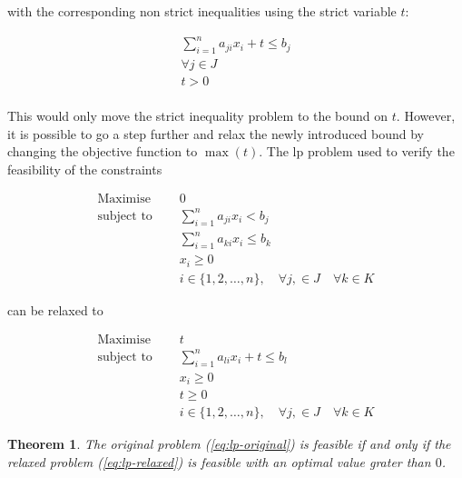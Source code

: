 \documentclass[preview,border=12pt,varwidth]{report}
\newtheorem{theorem}{Theorem}
\begin{document}
with the corresponding non strict inequalities using the strict variable $t$:

\begin{align*}
    \sum_{i=1}^{n} a_{ji}x_{i} + t \le b_j \\
    \forall j \in J                        \\
    t > 0                                  \\
\end{align*}

This would only move the strict inequality problem to the bound on $t$.
However, it is possible to go a step further and relax the newly introduced bound by changing the objective function to $\max(t)$.
The lp problem used to verify the feasibility of the constraints

\begin{equation}
    \label{eq:lp-original}
    \begin{split}
        \text{Maximise }   \quad & 0                                  \\
        \text{subject to } \quad & \sum_{i=1}^{n} a_{ji}x_{i} < b_j   \\
        \quad                    & \sum_{i=1}^{n} a_{ki}x_{i} \le b_k \\
        & x_i \ge 0                            \\
        & i \in \{1, 2, \ldots, n\}, \quad \forall j, \in J \quad \forall k \in K
    \end{split}
\end{equation}

can be relaxed to

\begin{equation}
    \label{eq:lp-relaxed}
    \begin{split}
        \text{Maximise }   \quad & t                                      \\
        \text{subject to } \quad & \sum_{i=1}^{n} a_{li}x_{i} + t \le b_l \\
        & x_i \ge 0                                                       \\
        & t \ge 0                                                         \\
        & i \in \{1, 2, \ldots, n\}, \quad \forall j, \in J \quad \forall k \in K
    \end{split}
\end{equation}

\begin{theorem}
    The original problem (\autoref{eq:lp-original}) is feasible if and only if the relaxed problem (\autoref{eq:lp-relaxed}) is feasible with an optimal value grater than $0$.
\end{theorem}
\end{document}
